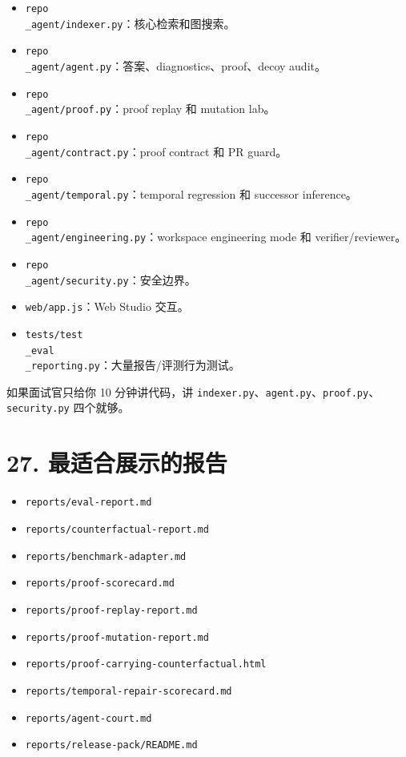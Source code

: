\documentclass[UTF8,12pt,openany]{ctexbook}
\begin{document}
\begin{itemize}
\item \texttt{repo\\_agent/indexer.py}：核心检索和图搜索。
\item \texttt{repo\\_agent/agent.py}：答案、diagnostics、proof、decoy audit。
\item \texttt{repo\\_agent/proof.py}：proof replay 和 mutation lab。
\item \texttt{repo\\_agent/contract.py}：proof contract 和 PR guard。
\item \texttt{repo\\_agent/temporal.py}：temporal regression 和 successor inference。
\item \texttt{repo\\_agent/engineering.py}：workspace engineering mode 和 verifier/reviewer。
\item \texttt{repo\\_agent/security.py}：安全边界。
\item \texttt{web/app.js}：Web Studio 交互。
\item \texttt{tests/test\\_eval\\_reporting.py}：大量报告/评测行为测试。
\end{itemize}

如果面试官只给你 10 分钟讲代码，讲 \texttt{indexer.py}、\texttt{agent.py}、\texttt{proof.py}、\texttt{security.py} 四个就够。\par

\section{27. 最适合展示的报告}

\begin{itemize}
\item \texttt{reports/eval-report.md}
\item \texttt{reports/counterfactual-report.md}
\item \texttt{reports/benchmark-adapter.md}
\item \texttt{reports/proof-scorecard.md}
\item \texttt{reports/proof-replay-report.md}
\item \texttt{reports/proof-mutation-report.md}
\item \texttt{reports/proof-carrying-counterfactual.html}
\item \texttt{reports/temporal-repair-scorecard.md}
\item \texttt{reports/agent-court.md}
\item \texttt{reports/release-pack/README.md}
\end{itemize}
\end{document}
